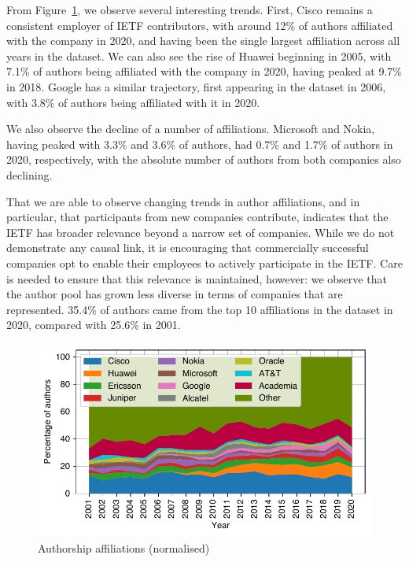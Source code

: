 \documentclass[twocolumn,10pt]{article}
\newlength{\figureWidthOneColumn}
\begin{document}
From Figure~\ref{fig:author_affiliations_normalised}, we observe several
interesting trends.  First, Cisco remains a consistent employer of IETF
contributors, with around 12\% of authors affiliated with the company in
2020, and having been the single largest affiliation across all years in
the dataset. We can also see the rise of Huawei beginning in 2005, with
7.1\% of authors being affiliated with the company in 2020, having peaked
at 9.7\% in 2018. Google has a similar trajectory, first appearing in the
dataset in 2006, with 3.8\% of authors being affiliated with it in 2020.

We also observe the decline of a number of affiliations.  Microsoft and
Nokia, having peaked with 3.3\% and 3.6\% of authors, had 0.7\% and 1.7\%
of authors in 2020, respectively, with the absolute number of authors from
both companies also declining.

That we are able to observe changing trends in author affiliations, and in
particular, that participants from new companies contribute, indicates that
the IETF has broader relevance beyond a narrow set of companies. While we
do not demonstrate any causal link, it is encouraging that commercially
successful companies opt to enable their employees to actively participate
in the IETF. Care is needed to ensure that this relevance is maintained,
however: we observe that the author pool has grown less diverse in terms of
companies that are represented. 35.4\% of authors came from the top 10
affiliations in the dataset in 2020, compared with 25.6\% in 2001. 


\begin{figure}
  \centering
  \includegraphics[width=\figureWidthOneColumn]{figures-prev/imc-2021/authors/top5_affiliations_normalised.pdf}
  \caption{
    Authorship affiliations (normalised)
  }
  \label{fig:author_affiliations_normalised}
\end{figure}
\end{document}
